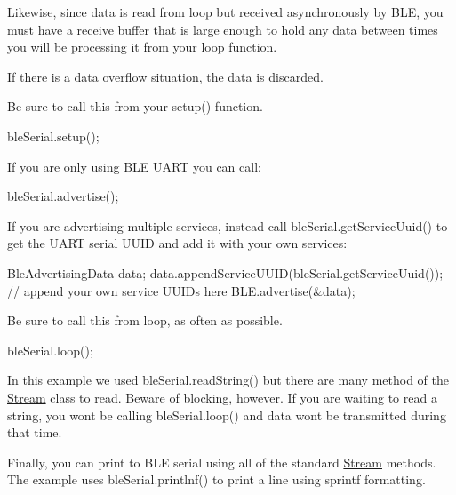 Likewise, since data is read from loop but received asynchronously by B\+LE, you must have a receive buffer that is large enough to hold any data between times you will be processing it from your loop function.

If there is a data overflow situation, the data is discarded.

Be sure to call this from your setup() function.


\begin{DoxyCode}
bleSerial.setup();
\end{DoxyCode}


If you are only using B\+LE U\+A\+RT you can call\+:


\begin{DoxyCode}
bleSerial.advertise();
\end{DoxyCode}


If you are advertising multiple services, instead call {\ttfamily ble\+Serial.\+get\+Service\+Uuid()} to get the U\+A\+RT serial U\+U\+ID and add it with your own services\+:


\begin{DoxyCode}
BleAdvertisingData data;
data.appendServiceUUID(bleSerial.getServiceUuid());
// append your own service UUIDs here
BLE.advertise(&data);
\end{DoxyCode}


Be sure to call this from loop, as often as possible.


\begin{DoxyCode}
bleSerial.loop();
\end{DoxyCode}


In this example we used {\ttfamily ble\+Serial.\+read\+String()} but there are many method of the \mbox{\hyperlink{class_stream}{Stream}} class to read. Beware of blocking, however. If you are waiting to read a string, you won\textquotesingle{}t be calling {\ttfamily ble\+Serial.\+loop()} and data won\textquotesingle{}t be transmitted during that time.

Finally, you can print to B\+LE serial using all of the standard \mbox{\hyperlink{class_stream}{Stream}} methods. The example uses {\ttfamily ble\+Serial.\+printlnf()} to print a line using {\ttfamily sprintf} formatting. 
